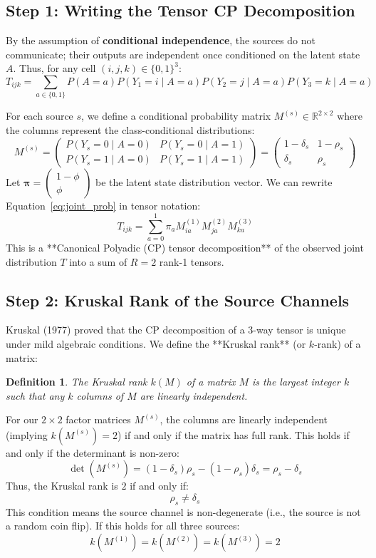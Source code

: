 \documentclass[11pt,a4paper]{article}
\newtheorem{definition}{Definition}
\begin{document}
\subsection{Step 1: Writing the Tensor CP Decomposition}
By the assumption of \textbf{conditional independence}, the sources do not communicate; their outputs are independent once conditioned on the latent state $A$. Thus, for any cell $(i, j, k) \in \{0, 1\}^3$:
\begin{equation}\label{eq:joint_prob}
T_{ijk} = \sum_{a \in \{0, 1\}} P(A = a) P(Y_1=i \mid A=a) P(Y_2=j \mid A=a) P(Y_3=k \mid A=a)
\end{equation}

For each source $s$, we define a conditional probability matrix $M^{(s)} \in \mathbb{R}^{2 \times 2}$ where the columns represent the class-conditional distributions:
\[
M^{(s)} = \begin{pmatrix} 
P(Y_s=0 \mid A=0) & P(Y_s=0 \mid A=1) \\ 
P(Y_s=1 \mid A=0) & P(Y_s=1 \mid A=1) 
\end{pmatrix} = \begin{pmatrix} 
1 - \delta_s & 1 - \rho_s \\ 
\delta_s & \rho_s 
\end{pmatrix}
\]
Let $\boldsymbol{\pi} = \begin{pmatrix} 1 - \phi \\ \phi \end{pmatrix}$ be the latent state distribution vector. We can rewrite Equation~\eqref{eq:joint_prob} in tensor notation:
\[
T_{ijk} = \sum_{a=0}^{1} \pi_a M^{(1)}_{ia} M^{(2)}_{ja} M^{(3)}_{ka}
\]
This is a **Canonical Polyadic (CP) tensor decomposition** of the observed joint distribution $T$ into a sum of $R=2$ rank-1 tensors.

\subsection{Step 2: Kruskal Rank of the Source Channels}
Kruskal (1977) proved that the CP decomposition of a 3-way tensor is unique under mild algebraic conditions. We define the **Kruskal rank** (or $k$-rank) of a matrix:
\begin{definition}
The Kruskal rank $k(M)$ of a matrix $M$ is the largest integer $k$ such that any $k$ columns of $M$ are linearly independent.
\end{definition}

For our $2 \times 2$ factor matrices $M^{(s)}$, the columns are linearly independent (implying $k(M^{(s)}) = 2$) if and only if the matrix has full rank. This holds if and only if the determinant is non-zero:
\[
\det(M^{(s)}) = (1 - \delta_s)\rho_s - (1 - \rho_s)\delta_s = \rho_s - \delta_s
\]
Thus, the Kruskal rank is $2$ if and only if:
\[
\rho_s \neq \delta_s
\]
This condition means the source channel is non-degenerate (i.e., the source is not a random coin flip). If this holds for all three sources:
\[
k(M^{(1)}) = k(M^{(2)}) = k(M^{(3)}) = 2
\]
\end{document}
